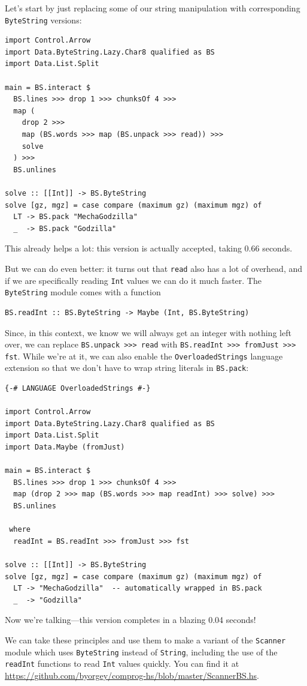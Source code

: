 \documentclass{book}
\newcommand{\h}[1]{\texttt{#1}}
\begin{document}
Let's start by just replacing some of our string manipulation with
corresponding \h{ByteString} versions:
\begin{verbatim}
import Control.Arrow
import Data.ByteString.Lazy.Char8 qualified as BS
import Data.List.Split

main = BS.interact $
  BS.lines >>> drop 1 >>> chunksOf 4 >>>
  map (
    drop 2 >>>
    map (BS.words >>> map (BS.unpack >>> read)) >>>
    solve
  ) >>>
  BS.unlines

solve :: [[Int]] -> BS.ByteString
solve [gz, mgz] = case compare (maximum gz) (maximum mgz) of
  LT -> BS.pack "MechaGodzilla"
  _  -> BS.pack "Godzilla"
\end{verbatim}
This already helps a lot: this version is actually accepted, taking
0.66 seconds.

But we can do even better: it turns out that \h{read} also has a lot
of overhead, and if we are specifically reading \h{Int} values we can
do it much faster.  The \h{ByteString} module comes with a function
\begin{verbatim}
BS.readInt :: BS.ByteString -> Maybe (Int, BS.ByteString)
\end{verbatim}
Since, in this context, we know we will always get an integer with
nothing left over, we can replace \h{BS.unpack >>> read} with \h{BS.readInt
>>> fromJust >>> fst}.  While we're at it, we can also enable the
\h{OverloadedStrings} language extension so that we don't have to wrap
string literals in \h{BS.pack}:

\begin{verbatim}
{-# LANGUAGE OverloadedStrings #-}

import Control.Arrow
import Data.ByteString.Lazy.Char8 qualified as BS
import Data.List.Split
import Data.Maybe (fromJust)

main = BS.interact $
  BS.lines >>> drop 1 >>> chunksOf 4 >>>
  map (drop 2 >>> map (BS.words >>> map readInt) >>> solve) >>>
  BS.unlines

 where
  readInt = BS.readInt >>> fromJust >>> fst

solve :: [[Int]] -> BS.ByteString
solve [gz, mgz] = case compare (maximum gz) (maximum mgz) of
  LT -> "MechaGodzilla"  -- automatically wrapped in BS.pack
  _  -> "Godzilla"
\end{verbatim}
Now we're talking---this version completes in a blazing 0.04 seconds!

We can take these principles and use them to make a variant of the
\h{Scanner} module which uses \h{ByteString} instead of
\h{String}, including the use of the \h{readInt} functions to read
\h{Int} values quickly.  You can find it
at \url{https://github.com/byorgey/comprog-hs/blob/master/ScannerBS.hs}.
\end{document}
